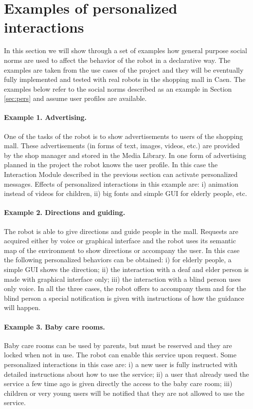 \vspace{-0.2cm}
\section{Examples of personalized interactions}
\vspace{-0.1cm}
In this section we will show through a set of examples how general purpose social norms are used to affect the behavior of the robot in a declarative way. The examples are taken from the use cases of the {\coaches} project and they will be eventually fully implemented and tested with real robots in the shopping mall in Caen. The examples below refer to the social norms described as an example in Section \ref{sec:pers} and assume user profiles are available.

\paragraph{Example 1. Advertising.} One of the tasks of the {\coaches} robot is to show advertisements to users of the shopping mall. These advertisements (in forms of text, images, videos, etc.) are provided by the shop manager and stored in the Media Library. 
In one form of advertising planned in the project the robot knows the user profile. In this case the Interaction Module described in the previous section can activate personalized messages.
Effects of personalized interactions in this example are: i) animation instead of videos for children, ii) big fonts and simple GUI for elderly people, etc. 

\paragraph{Example 2. Directions and guiding.} The robot is able to give directions and guide people in the mall. Requests are acquired either by voice or graphical interface and the robot uses its semantic map of the environment to show directions or accompany the user. In this case the following personalized behaviors can be obtained: i) for elderly people, a simple GUI shows the direction; ii) the interaction with a deaf and elder person is made with graphical interface only; iii) the interaction with a blind person uses only voice. In all the three cases, the robot offers to accompany them and for the blind person a special notification is given with instructions of how the guidance will happen.

\paragraph{Example 3. Baby care rooms.} Baby care rooms can be used by parents, but must be reserved and they are locked when not in use. The robot can enable this service upon request. Some personalized interactions in this case are: i) a new user is fully instructed with detailed instructions about how to use the service; ii) a user that already used the service a few time ago is given directly the access to the baby care room; iii) children or very young users will be notified that they are not allowed to use the service.

